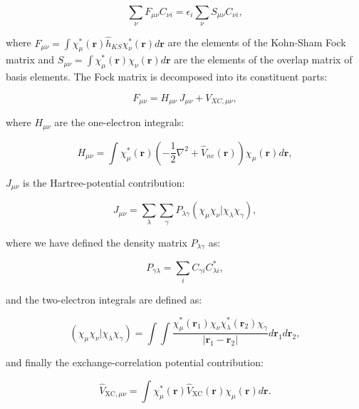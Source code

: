 \begin{equation}
 \sum_{\nu} F_{\mu\nu} C_{\nu i} =
    \epsilon_i \sum_{\nu} S_{\mu\nu} C_{\nu i} , 
\end{equation}

where $F_{\mu\nu} = \int \chi_{\mu}^*(\bm{r}) \hat{h}_{KS}
\chi_{\nu}^*(\bm{r}) d\bm{r} $ are the elements of the Kohn-Sham
Fock matrix and $S_{\mu\nu} = \int \chi_{\mu}^*(\bm{r}) \chi_{\nu}
(\bm{r}) d\bm{r}$ are the elements of the overlap matrix
of basis elements.
The Fock matrix is decomposed into its constituent parts:

\begin{equation}
F_{\mu\nu} = H_{\mu\nu} \ J_{\mu\nu} + V_{XC,\mu\nu} ,
\end{equation}

where $H_{\mu\nu}$ are the one-electron integrals:

\begin{equation}
H_{\mu\nu} = \int \chi_{\mu}^*(\bm{r})
    \left( -\frac{1}{2} \nabla^2 + \hat{V}_{ne}(\bm{r}) \right)
    \chi_{\mu}(\bm{r}) d\bm{r} ,
\end{equation}

$J_{\mu\nu}$ is the Hartree-potential contribution:

\begin{equation}
    J_{\mu\nu} = \sum_{\lambda} \sum_{\gamma} P_{\lambda\gamma}
    \left(\chi_{\mu}\chi_{\nu} | \chi_{\lambda}\chi_{\gamma}\right) ,
\end{equation}

where we have defined the density matrix $P_{\lambda\gamma}$ as:

\begin{equation}
P_{\gamma\lambda} = \sum_i C_{\gamma i} C_{\lambda i}^* ,
\end{equation}

and the two-electron integrals are defined as:

\begin{equation}
\left(\chi_{\mu}\chi_{\nu} | \chi_{\lambda}\chi_{\gamma}\right)
    = \int \int \frac{\chi_{\mu}^*(\bm{r}_1) \chi_{\nu}
    \chi_{\lambda}^*(\bm{r}_2) \chi_{\gamma}}
    {\left| \bm{r}_1 - \bm{r}_2 \right|}
    d\bm{r}_1 d\bm{r}_2 ,
\end{equation}

and finally the exchange-correlation potential contribution:

\begin{equation}
\hat{V}_{\text{XC},\mu\nu} = \int \chi_{\mu}^*(\bm{r})
    \hat{V}_{\text{XC}}(\bm{r}) \chi_{\mu}(\bm{r}) d\bm{r} .
\end{equation}

